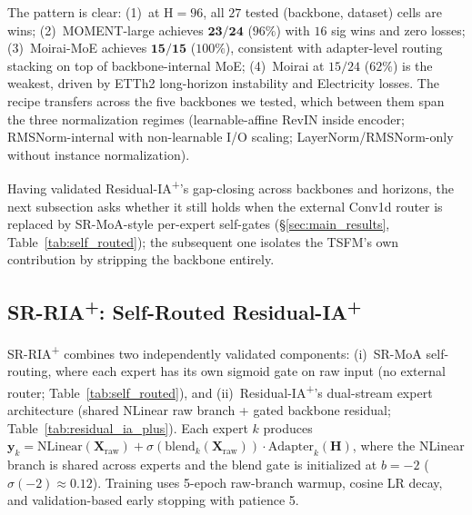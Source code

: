 \documentclass{article}
\begin{document}
The pattern is clear: (1)~at H${=}96$, all $27$ tested (backbone, dataset) cells are wins; (2)~MOMENT-large achieves $\mathbf{23/24}$ ($96\%$) with $16$ sig wins and zero losses; (3)~Moirai-MoE achieves $\mathbf{15/15}$ ($100\%$), consistent with adapter-level routing stacking on top of backbone-internal MoE; (4)~Moirai at $15/24$ ($62\%$) is the weakest, driven by ETTh2 long-horizon instability and Electricity losses. The recipe transfers across the five backbones we tested, which between them span the three normalization regimes (learnable-affine RevIN inside encoder; RMSNorm-internal with non-learnable I/O scaling; LayerNorm/RMSNorm-only without instance normalization).

Having validated Residual-IA\textsuperscript{+}'s gap-closing across backbones and horizons, the next subsection asks whether it still holds when the external Conv1d router is replaced by SR-MoA-style per-expert self-gates (\S\ref{sec:main_results}, Table~\ref{tab:self_routed}); the subsequent one isolates the TSFM's own contribution by stripping the backbone entirely.

\subsection{SR-RIA\textsuperscript{+}: Self-Routed Residual-IA\textsuperscript{+}}

SR-RIA\textsuperscript{+} combines two independently validated components: (i)~SR-MoA self-routing, where each expert has its own sigmoid gate on raw input (no external router; Table~\ref{tab:self_routed}), and (ii)~Residual-IA\textsuperscript{+}'s dual-stream expert architecture (shared NLinear raw branch + gated backbone residual; Table~\ref{tab:residual_ia_plus}). Each expert $k$ produces $\mathbf{y}_k = \text{NLinear}(\mathbf{X}_\text{raw}) + \sigma(\text{blend}_k(\mathbf{X}_\text{raw})) \cdot \text{Adapter}_k(\mathbf{H})$, where the NLinear branch is shared across experts and the blend gate is initialized at $b{=}{-}2$ ($\sigma(-2){\approx}0.12$). Training uses 5-epoch raw-branch warmup, cosine LR decay, and validation-based early stopping with patience 5.
\end{document}
